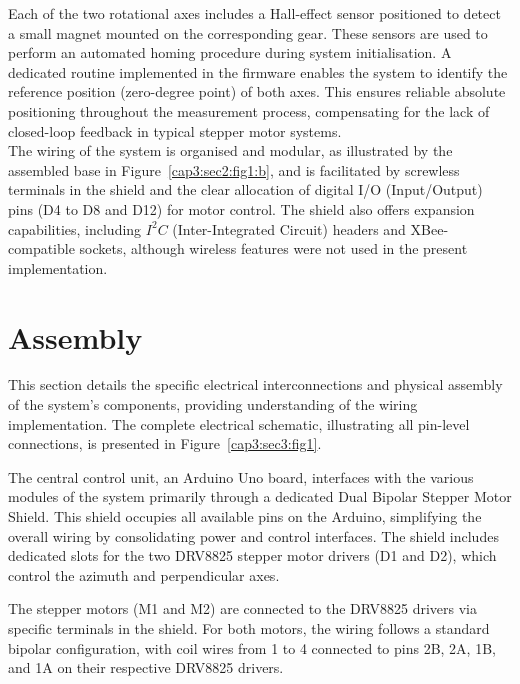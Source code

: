 \indent Each of the two rotational axes includes a Hall-effect sensor positioned to detect a small magnet mounted on the corresponding gear. These sensors are used to perform an automated homing procedure during system initialisation. A dedicated routine implemented in the firmware enables the system to identify the reference position (zero-degree point) of both axes. This ensures reliable absolute positioning throughout the measurement process, compensating for the lack of closed-loop feedback in typical stepper motor systems.\\
\vspace{0.1em}
\indent The wiring of the system is organised and modular, as illustrated by the assembled base in Figure~\ref{cap3:sec2:fig1:b}, and is facilitated by screwless terminals in the shield and the clear allocation of digital I/O (Input/Output)  pins (D4 to D8 and D12) for motor control. The shield also offers expansion capabilities, including $I^2C$ (Inter-Integrated Circuit) headers and XBee-compatible sockets, although wireless features were not used in the present implementation.

\section{Assembly}
\label{sec:electrical_wiring_assembly}

This section details the specific electrical interconnections and physical assembly of the system's components, providing understanding of the wiring implementation. The complete electrical schematic, illustrating all pin-level connections, is presented in Figure~\ref{cap3:sec3:fig1}.

The central control unit, an Arduino Uno board, interfaces with the various modules of the system primarily through a dedicated Dual Bipolar Stepper Motor Shield. This shield occupies all available pins on the Arduino, simplifying the overall wiring by consolidating power and control interfaces. The shield includes dedicated slots for the two DRV8825 stepper motor drivers (D1 and D2), which control the azimuth and perpendicular axes.

The stepper motors (M1 and M2) are connected to the DRV8825 drivers via specific terminals in the shield. For both motors, the wiring follows a standard bipolar configuration, with coil wires from 1 to 4 connected to pins 2B, 2A, 1B, and 1A on their respective DRV8825 drivers.

